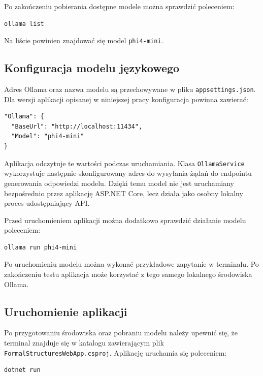 \documentclass[12pt]{article}
\begin{document}
Po zakończeniu pobierania dostępne modele można sprawdzić poleceniem:

\begin{verbatim}
ollama list
\end{verbatim}

Na liście powinien znajdować się model \texttt{phi4-mini}.

\subsection{Konfiguracja modelu językowego}

Adres Ollama oraz nazwa modelu są przechowywane w pliku \texttt{appsettings.json}. Dla wersji aplikacji opisanej w niniejszej pracy konfiguracja powinna zawierać:

\begin{lstlisting}[language={},caption={Konfiguracja połączenia aplikacji z Ollama},label={lst:ollama-config}]
"Ollama": {
  "BaseUrl": "http://localhost:11434",
  "Model": "phi4-mini"
}
\end{lstlisting}

Aplikacja odczytuje te wartości podczas uruchamiania. Klasa \texttt{OllamaService} wykorzystuje następnie skonfigurowany adres do wysyłania żądań do endpointu generowania odpowiedzi modelu. Dzięki temu model nie jest uruchamiany bezpośrednio przez aplikację ASP.NET Core, lecz działa jako osobny lokalny proces udostępniający API.

Przed uruchomieniem aplikacji można dodatkowo sprawdzić działanie modelu poleceniem:

\begin{verbatim}
ollama run phi4-mini
\end{verbatim}

Po uruchomieniu modelu można wykonać przykładowe zapytanie w terminalu. Po zakończeniu testu aplikacja może korzystać z tego samego lokalnego środowiska Ollama.

\subsection{Uruchomienie aplikacji}

Po przygotowaniu środowiska oraz pobraniu modelu należy upewnić się, że terminal znajduje się w katalogu zawierającym plik \texttt{FormalStructuresWebApp.csproj}. Aplikację uruchamia się poleceniem:

\begin{verbatim}
dotnet run
\end{verbatim}
\end{document}
